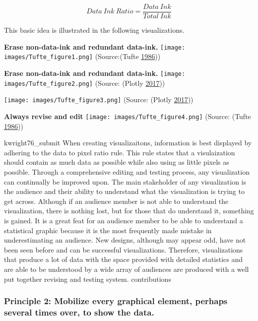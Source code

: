 \documentclass[]{book}
\begin{document}
\[{Data \ Ink \ Ratio} = \frac{{Data \ Ink}}{{Total \ Ink}}\]

This basic idea is illustrated in the following visualizations.

\textbf{Erase non-data-ink and redundant data-ink.}
\texttt{[image: images/Tufte\_figure1.png]}
(Source:(Tufte \protect\hyperlink{ref-The-Visual-Display-of-Quantitative-Information}{1986}))

\textbf{Erase non-data-ink and redundant data-ink.}
\texttt{[image: images/Tufte\_figure2.png]}
(Source: (Plotly \protect\hyperlink{ref-appli_2017}{2017}))

\texttt{[image: images/Tufte\_figure3.png]}
(Source: (Plotly \protect\hyperlink{ref-appli_2017}{2017}))

\textbf{Always revise and edit}
\texttt{[image: images/Tufte\_figure4.png]}
(Source: (Tufte \protect\hyperlink{ref-The-Visual-Display-of-Quantitative-Information}{1986}))

kwright76\_submit
When creating visualizaitons, information is best displayed by adhering to the data to pixel ratio rule. This rule states that a visulaization should contain as much data as possible while also using as little pixels as possible. Through a comprehensive editing and testing process, any visualization can continually be improved upon. The main stakeholder of any visualization is the audience and their ability to understand what the visualization is trying to get across. Although if an audience member is not able to understand the visualization, there is nothing lost, but for those that do understand it, something is gained. It is a great feat for an audience member to be able to understand a statistical graphic because it is the most frequently made mistake in underestimating an audience. New designs, although may appear odd, have not been seen before and can be successful visualizations. Therefore, visualizations that produce a lot of data with the space provided with detailed statistics and are able to be understood by a wide array of audiences are produced with a well put together revising and testing system.
contributions

\hypertarget{principle-2-mobilize-every-graphical-element-perhaps-several-times-over-to-show-the-data.}{%
\subsubsection{Principle 2: Mobilize every graphical element, perhaps several times over, to show the data.}\label{principle-2-mobilize-every-graphical-element-perhaps-several-times-over-to-show-the-data.}}
\end{document}
